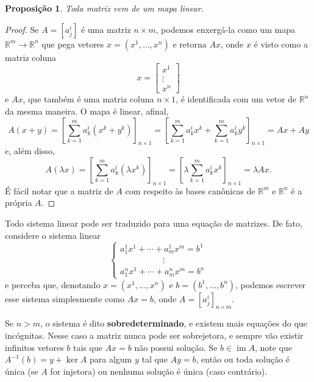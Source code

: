 \documentclass{article}
\newtheorem{proposition}[definition]{Proposição}
\DeclareMathOperator{\im}{im}
\begin{document}
\begin{proposition}
    Toda matriz vem de um mapa linear.
\end{proposition}
\begin{proof}
    Se $A = [a^i_j]$ é uma matriz $n \times m$, podemos enxergá-la como um mapa $\mathbb{R}^m \to \mathbb{R}^n$ que pega vetores $x = (x^1, \dots, x^n)$ e retorna $Ax$, onde $x$ é visto como a matriz coluna \begin{equation}
        x = \begin{bmatrix}
            x^1 \\ \vdots \\ x^n
        \end{bmatrix}
    \end{equation} e $Ax$, que também é uma matriz coluna $n \times 1$, é identificada com um vetor de $\mathbb{R}^n$ da mesma maneira. O mapa é linear, afinal, \begin{equation}
        A(x + y) = \left[\sum_{k = 1}^m a^i_k (x^k + y^k) \right]_{n \times 1} = \left[\sum_{k = 1}^m a^i_k x^k + \sum_{k = 1}^m a^i_k y^k \right]_{n \times 1} = Ax + Ay
    \end{equation} e, além disso, \begin{equation}
        A(\lambda x) = \left[\sum_{k = 1}^m a^i_k (\lambda x^k) \right]_{n \times 1} = \left[\lambda \sum_{k = 1}^m a^i_k x^k \right]_{n \times 1} = \lambda Ax.
    \end{equation} É fácil notar que a matriz de $A$ com respeito às bases canônicas de $\mathbb{R}^m$ e $\mathbb{R}^n$ é a própria $A$.
\end{proof}

Todo sistema linear pode ser traduzido para uma equação de matrizes. De fato, considere o sistema linear \begin{equation}
    \begin{cases}
        a^1_1 x^1 + \cdots + a^1_m x^m = b^1 \\ \quad \quad \quad \quad \quad \vdots \\ a^n_1 x^1 + \cdots + a^n_m x^m = b^n
    \end{cases}
\end{equation} e perceba que, denotando $x = (x^1, \dots, x^n)$ e $b = (b^1, \dots, b^n)$, podemos escrever esse sistema simplesmente como $Ax = b$, onde $A = [a^i_j]_{n \times m}$.

Se $n > m$, o sistema é dito \textbf{sobredeterminado}, e existem mais equações do que incógnitas. Nesse caso a matriz nunca pode ser sobrejetora, e sempre vão existir infinitos vetores $b$ tais que $Ax = b$ não possui solução. Se $b \in \im A$, note que $A^{-1}(b) = y + \ker A$ para algum $y$ tal que $Ay = b$, então ou toda solução é única (se $A$ for injetora) ou nenhuma solução é única (caso contrário).
\end{document}
